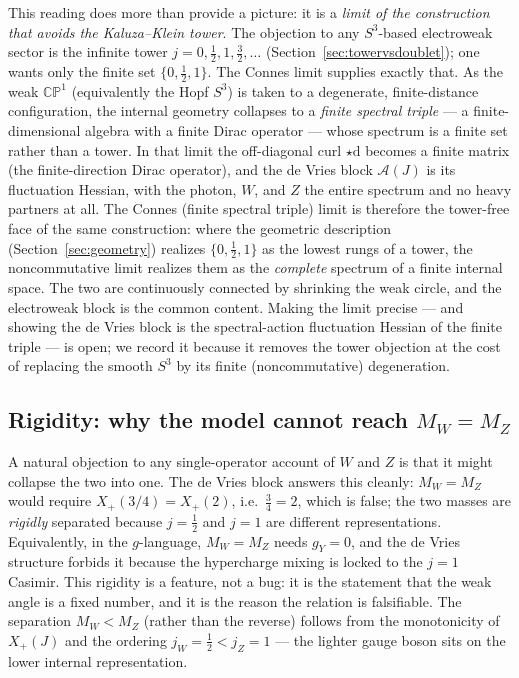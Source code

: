 \documentclass[11pt]{article}
\theoremstyle{plain}
\theoremstyle{definition}
\newcommand{\cA}{\mathcal{A}}
\newcommand{\Xp}{X_{+}}
\newcommand{\half}{\tfrac12}
\newcommand{\dd}{\mathrm{d}}
\begin{document}
This reading does more than provide a picture: it is a \emph{limit of the
construction that avoids the Kaluza--Klein tower}. The objection to any
$S^3$-based electroweak sector is the infinite tower $j=0,\half,1,\tfrac32,
\dots$ (Section~\ref{sec:towervsdoublet}); one wants only the finite set
$\{0,\half,1\}$. The Connes limit supplies exactly that. As the weak
$\mathbb{CP}^1$ (equivalently the Hopf $S^3$) is taken to a degenerate,
finite-distance configuration, the internal geometry collapses to a
\emph{finite spectral triple} --- a finite-dimensional algebra with a
finite Dirac operator --- whose spectrum is a finite set rather than a tower.
In that limit the off-diagonal curl $\star\dd$ becomes a finite matrix (the
finite-direction Dirac operator), and the de Vries block $\cA(J)$ is its
fluctuation Hessian, with the photon, $W$, and $Z$ the entire spectrum and no
heavy partners at all. The Connes (finite spectral triple) limit is therefore
the tower-free face of the same construction: where the geometric description
(Section~\ref{sec:geometry}) realizes $\{0,\half,1\}$ as the lowest rungs of a
tower, the noncommutative limit realizes them as the \emph{complete} spectrum
of a finite internal space. The two are continuously connected by shrinking
the weak circle, and the electroweak block is the common content. Making the
limit precise --- and showing the de Vries block is the spectral-action
fluctuation Hessian of the finite triple --- is open; we record it because it
removes the tower objection at the cost of replacing the smooth $S^3$ by its
finite (noncommutative) degeneration.

\subsection{Rigidity: why the model cannot reach $M_W=M_Z$}
\label{sec:rigidity}

A natural objection to any single-operator account of $W$ and $Z$ is that it
might collapse the two into one. The de Vries block answers this cleanly:
$M_W=M_Z$ would require $\Xp(3/4)=\Xp(2)$, i.e.\ $\tfrac34=2$, which is
false; the two masses are \emph{rigidly} separated because $j=\half$ and
$j=1$ are different representations. Equivalently, in the
$g$-language, $M_W=M_Z$ needs $g_Y=0$, and the de Vries structure forbids it
because the hypercharge mixing is locked to the $j=1$ Casimir. This rigidity
is a feature, not a bug: it is the statement that the weak angle is a fixed
number, and it is the reason the relation is falsifiable. The separation
$M_W<M_Z$ (rather than the reverse) follows from the monotonicity of
$\Xp(J)$ and the ordering $j_W=\half<j_Z=1$ --- the lighter gauge boson sits
on the lower internal representation.
\end{document}
